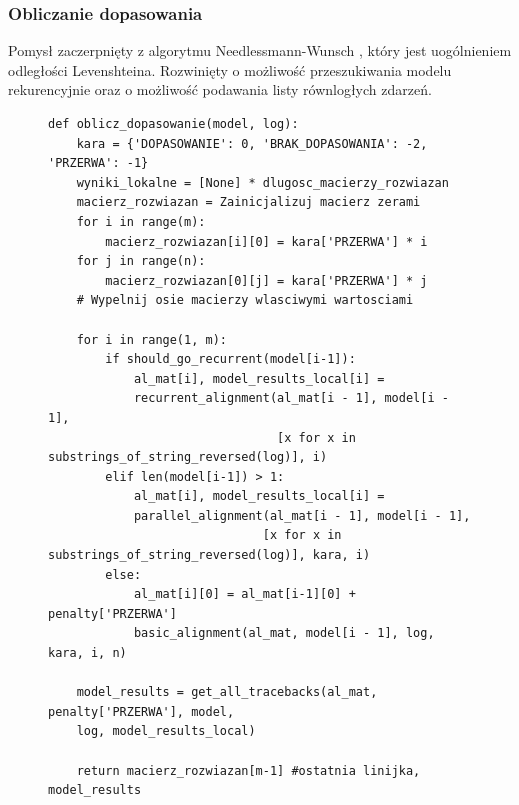 \subsubsection{Obliczanie dopasowania}
Pomysł zaczerpnięty z algorytmu Needlessmann-Wunsch \cite{ea252fd3937a4a309a5e07e61e5531a7}, który jest uogólnieniem odległości Levenshteina. Rozwinięty o możliwość przeszukiwania modelu rekurencyjnie oraz o możliwość podawania listy równlogłych zdarzeń.
\begin{figure}[!ht]
\lstset{caption=Obliczanie dopasowania, captionpos=b}
\lstset{label=src:alignment_calculation, frame=single}
\begin{lstlisting}
def oblicz_dopasowanie(model, log):
    kara = {'DOPASOWANIE': 0, 'BRAK_DOPASOWANIA': -2, 'PRZERWA': -1}
    wyniki_lokalne = [None] * dlugosc_macierzy_rozwiazan
    macierz_rozwiazan = Zainicjalizuj macierz zerami
    for i in range(m):
        macierz_rozwiazan[i][0] = kara['PRZERWA'] * i
    for j in range(n):
        macierz_rozwiazan[0][j] = kara['PRZERWA'] * j
    # Wypelnij osie macierzy wlasciwymi wartosciami

    for i in range(1, m):
        if should_go_recurrent(model[i-1]):
            al_mat[i], model_results_local[i] = 
            recurrent_alignment(al_mat[i - 1], model[i - 1],
                                [x for x in substrings_of_string_reversed(log)], i)
        elif len(model[i-1]) > 1:
            al_mat[i], model_results_local[i] = 
            parallel_alignment(al_mat[i - 1], model[i - 1],
                              [x for x in substrings_of_string_reversed(log)], kara, i)
        else:
            al_mat[i][0] = al_mat[i-1][0] + penalty['PRZERWA']
            basic_alignment(al_mat, model[i - 1], log, kara, i, n)

    model_results = get_all_tracebacks(al_mat, penalty['PRZERWA'], model, 
    log, model_results_local)

    return macierz_rozwiazan[m-1] #ostatnia linijka, model_results
\end{lstlisting}
\end{figure}

